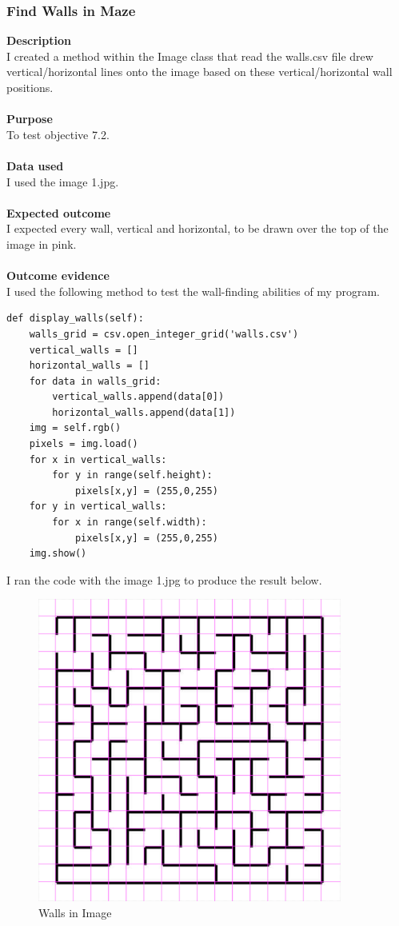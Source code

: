 \documentclass[titlepage]{article}
\begin{document}
\subsubsection{Find Walls in Maze}
\textbf{Description}\\
I created a method within the Image class that read the walls.csv file drew vertical/horizontal lines onto the image based on these vertical/horizontal wall positions.\\\\
\textbf{Purpose}\\
To test objective 7.2.\\\\
\textbf{Data used} \\
I used the image 1.jpg. \\\\
\textbf{Expected outcome}\\
I expected every wall, vertical and horizontal, to be drawn over the top of the image in pink. \\\\
\textbf{Outcome evidence}\\
I used the following method to test the wall-finding abilities of my program.
\begin{changemargin}{-1in}{-1in} 
\begin{verbatim}
def display_walls(self):
    walls_grid = csv.open_integer_grid('walls.csv')
    vertical_walls = []
    horizontal_walls = []
    for data in walls_grid:
        vertical_walls.append(data[0])
        horizontal_walls.append(data[1])
    img = self.rgb()
    pixels = img.load()
    for x in vertical_walls:
        for y in range(self.height):
            pixels[x,y] = (255,0,255)
    for y in vertical_walls:
        for x in range(self.width):
            pixels[x,y] = (255,0,255)
    img.show()
\end{verbatim}
\end{changemargin} 

I ran the code with the image 1.jpg to produce the result below.

\begin{figure}[H]
  \centering
  \includegraphics[width=10cm]{wally.png}
  \caption{Walls in Image}
  \label{fig:dijk}
\end{figure}
\end{document}
